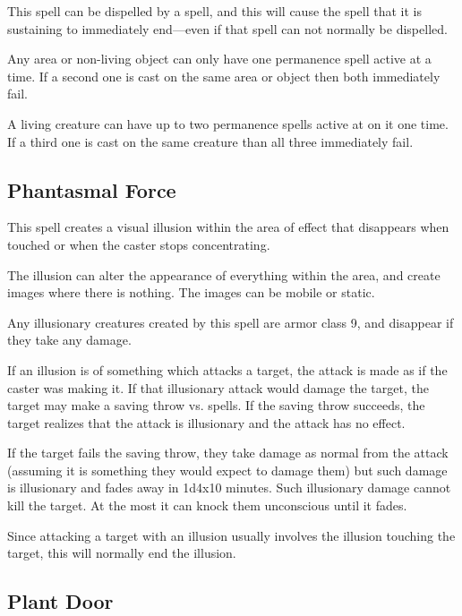 \begin{multicols*}{2}
This spell can be dispelled by a  spell, and this will cause the spell that it is sustaining to immediately end—even if that spell can not normally be dispelled.

Any area or non-living object can only have one permanence spell active at a time. If a second one is cast on the same area or object then both immediately fail.

A living creature can have up to two permanence spells active at on it one time. If a third one is cast on the same creature than all three immediately fail.

\subsection{Phantasmal Force}\label{spell:Phantasmal Force}

This spell creates a visual illusion within the area of effect that disappears when touched or when the caster stops concentrating.

The illusion can alter the appearance of everything within the area, and create images where there is nothing. The images can be mobile or static.

Any illusionary creatures created by this spell are armor class 9, and disappear if they take any damage.

If an illusion is of something which attacks a target, the attack is made as if the caster was making it. If that illusionary attack would damage the target, the target may make a saving throw vs. spells. If the saving throw succeeds, the target realizes that the attack is illusionary and the attack has no effect.

If the target fails the saving throw, they take damage as normal from the attack (assuming it is something they would expect to damage them) but such damage is illusionary and fades away in 1d4x10 minutes. Such illusionary damage cannot kill the target. At the most it can knock them unconscious until it fades.

Since attacking a target with an illusion usually involves the illusion touching the target, this will normally end the illusion.

\subsection{Plant Door}\label{spell:Plant Door}
\end{multicols*}
